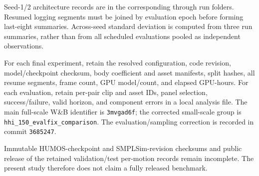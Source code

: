 Seed-1/2 architecture records are in the corresponding
 through
 run folders. Resumed logging segments
must be joined by evaluation epoch before forming last-eight summaries.
Across-seed standard deviation is computed from three run summaries, rather
than from all scheduled evaluations pooled as independent observations.

For each final experiment, retain the resolved configuration, code revision,
model/checkpoint checksum, body coefficient and asset manifests, split hashes,
all resume segments, frame count, GPU model/count, and elapsed GPU-hours.
For each evaluation, retain per-pair clip and asset IDs, panel selection,
success/failure, valid horizon, and component errors in a local analysis file.
The main full-scale W\&B identifier is \texttt{3mvgad6f}; the corrected
small-scale group is \texttt{hhi\_150\_evalfix\_comparison}.
The evaluation/sampling correction is recorded in commit \texttt{3685247}.

Immutable HUMOS-checkpoint and SMPLSim-revision checksums and public release
of the retained validation/test per-motion records remain incomplete. The
present study therefore does not claim a fully released benchmark.
